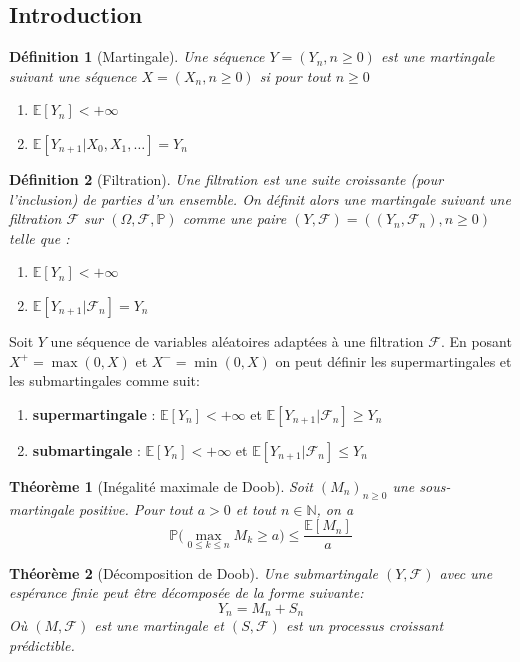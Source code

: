 \documentclass[a4paper]{article}
\newtheorem{theorem}{Théorème}[section]
\newtheorem{definition}{Définition}
\begin{document}
\subsection{Introduction}
\begin{definition}[Martingale]
Une séquence $Y = (Y_n, n\geq 0)$ est une martingale suivant une séquence $X = (X_n, n\geq 0)$ si pour tout $n \geq 0$
\begin{enumerate} [label=\textit{(\roman*)}]
\item $\mathbb{E}[Y_n] < +\infty$
\item $\mathbb{E}[Y_{n+1} | X_0, X_1, \dots] = Y_n$
\end{enumerate}
\end{definition}
\begin{definition}[Filtration]
     Une filtration est une suite croissante (pour l'inclusion) de parties d'un ensemble. On définit alors une martingale suivant une filtration $\mathcal{F}$ sur $(\Omega, \mathcal{F}, \mathbb{P})$ comme une paire $(Y, \mathcal{F})=((Y_n, \mathcal{F}_n), n\geq 0)$ telle que :
\begin{enumerate} [label=\textit{(\roman*)}]
\item $\mathbb{E}[Y_n] < +\infty$
\item $\mathbb{E}[Y_{n+1} | \mathcal{F}_n] = Y_n$
\end{enumerate}
\end{definition}
Soit $Y$ une séquence de variables aléatoires adaptées à une filtration $\mathcal{F}$. En posant $X^+ = \max{(0, X)}$ et $X^- = \min{(0, X)}$ on peut définir les supermartingales et les submartingales comme suit: 
\begin{enumerate}[label=\textit{(\roman*)}]
    \item \textbf{supermartingale} : $\mathbb{E}[Y_n] < +\infty$ et  $\mathbb{E}[Y_{n+1} | \mathcal{F}_n] \geq Y_n$
    \item \textbf{submartingale} : $\mathbb{E}[Y_n] < +\infty$ et  $\mathbb{E}[Y_{n+1}| \mathcal{F}_n] \leq Y_n$
\end{enumerate}
\begin{theorem}[Inégalité maximale de Doob] Soit $(M_n)_{n\geq 0}$ une sous-martingale positive. Pour tout $a > 0$ et tout $n\in \mathbb{N}$, on a 
\begin{equation}
    \mathbb{P}\bigg(\underset{0 \leq k \leq n}{\max}M_k \geq a\bigg) \leq \frac{\mathbb{E}[M_n]}{a}
\end{equation}
\end{theorem}
\begin{theorem}[Décomposition de Doob] Une submartingale $(Y, \mathcal{F})$ avec une espérance finie peut être décomposée de la forme suivante:
\begin{equation}
    Y_n = M_n + S_n
\end{equation}
Où $(M, \mathcal{F})$ est une martingale et $(S, \mathcal{F})$ est un processus croissant prédictible.
\end{theorem}
\end{document}
